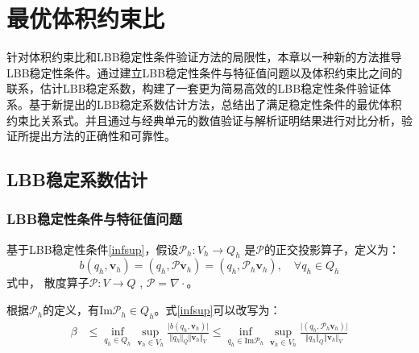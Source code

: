 \chapter{最优体积约束比}
针对体积约束比和LBB稳定性条件验证方法的局限性，本章以一种新的方法推导LBB稳定性条件。通过建立LBB稳定性条件与特征值问题以及体积约束比之间的联系，估计LBB稳定系数，构建了一套更为简易高效的LBB稳定性条件验证体系。基于新提出的LBB稳定系数估计方法，总结出了满足稳定性条件的最优体积约束比关系式。并且通过与经典单元的数值验证与解析证明结果进行对比分析，验证所提出方法的正确性和可靠性。
\section{LBB稳定系数估计}
\subsection{LBB稳定性条件与特征值问题}

基于LBB稳定性条件\eqref{infsup}，假设$\mathcal P_h:V_h \rightarrow Q_h$ 是$\mathcal P$的正交投影算子，定义为：
\begin{equation}\label{Ph}
    b(q_h,\boldsymbol v_h) = (q_h, \mathcal P \boldsymbol v_h) = (q_h, \mathcal P_h \boldsymbol v_h), \quad \forall q_h \in Q_h
\end{equation}
式中， 散度算子$\mathcal P:V\rightarrow Q$ , $\mathcal P = \nabla \cdot$。

根据$\mathcal P_h$的定义，有$\mathrm{Im}\mathcal P_h \in Q_h$。式\eqref{infsup}可以改写为：
\begin{equation} \label{r11}
    \begin{split}
        \beta &\le \inf_{q_h \in Q_h} \sup_{\boldsymbol v_h \in V_h} \frac{\vert b(q_h,\boldsymbol v_h) \vert}{\Vert q_h \Vert_Q \Vert \boldsymbol v_h \Vert_V} 
        \le \inf_{q_h \in \mathrm{Im}\mathcal P_h} \sup_{\boldsymbol v_h \in V_h} \frac{\vert (q_h,\mathcal P_h \boldsymbol v_h) \vert}{\Vert q_h \Vert_Q \Vert \boldsymbol v_h \Vert_V} \\
    \end{split}
\end{equation}

